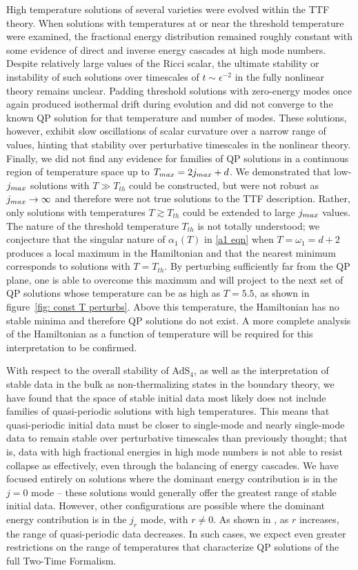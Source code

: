 \documentclass[../PhD.tex]{subfiles}
\begin{document}
High temperature solutions of several varieties were evolved within the TTF theory. When solutions with temperatures at or near the threshold temperature were examined, the fractional energy distribution remained roughly constant with some evidence of direct and inverse energy cascades at high mode numbers. Despite relatively large values of the Ricci scalar, the ultimate stability or instability of such solutions over timescales of $t \sim \epsilon^{-2}$ in the fully nonlinear theory remains unclear. Padding threshold solutions with zero-energy modes once again produced isothermal drift during evolution and did not converge to the known QP solution for that temperature and number of modes. These solutions, however, exhibit slow oscillations of scalar curvature over a narrow range of values, hinting that stability over perturbative timescales in the nonlinear theory. Finally, we did not find any evidence for families of QP solutions in a continuous region of temperature space up to $T_{max} = 2j_{max} + d$. We demonstrated that low-$j_{max}$ solutions with $T \gg T_{th}$ could be constructed, but were not robust as $j_{max} \to \infty$ and therefore were not true solutions to the TTF description. Rather, only solutions with temperatures $T \gtrsim T_{th}$ could be extended to large $j_{max}$ values. The nature of the threshold temperature $T_{th}$ is not totally understood; we conjecture that the singular nature of $\alpha_1 (T)$ in \eqref{a1 eqn} when $T = \omega_1 = d + 2$ produces a local maximum in the Hamiltonian and that the nearest minimum corresponds to solutions with $T = T_{th}$. By perturbing sufficiently far from the QP plane, one is able to overcome this maximum and will project to the next set of QP solutions whose temperature can be as high as $T = 5.5$, as shown in figure~\ref{fig: const T perturbs}. Above this temperature, the Hamiltonian has no stable minima and therefore QP solutions do not exist. A more complete analysis of the Hamiltonian as a function of temperature will be required for this interpretation to be confirmed.

With respect to the overall stability of AdS$_4$, as well as the interpretation of stable data in the bulk as non-thermalizing states in the boundary theory, we have found that the space of stable initial data most likely does not include families of quasi-periodic solutions with high temperatures. This means that quasi-periodic initial data must be closer to single-mode and nearly single-mode data to remain stable over perturbative timescales than previously thought; that is, data with high fractional energies in high mode numbers is not able to resist collapse as effectively, even through the balancing of energy cascades. We have focused entirely on solutions where the dominant energy contribution is in the $j = 0$ mode -- these solutions would generally offer the greatest range of stable initial data. However, other configurations are possible where the dominant energy contribution is in the $j_r$ mode, with $r \neq 0$. As shown in \cite{1507.08261}, as $r$ increases, the range of quasi-periodic data decreases. In such cases, we expect even greater restrictions on the range of temperatures that characterize QP solutions of the full Two-Time Formalism. 
\end{document}
